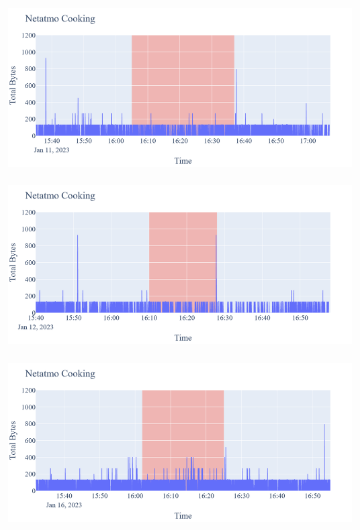 \begin{figure}[H]
\begin{subfigure}[b]{0.5\textwidth}
    \end{subfigure}
    \begin{subfigure}[b]{0.5\textwidth}
        \centering
        \includegraphics[width=1.2\hsize]{figures/Netatmo_Cooking_Bytes_11.01.png}
    \end{subfigure}
    \begin{subfigure}[b]{0.5\textwidth}
        \centering
        \includegraphics[width=1.2\hsize]{figures/Netatmo_Cooking_Bytes_12.01.png}
    \end{subfigure}
    \begin{subfigure}[b]{0.5\textwidth}
        \centering
        \includegraphics[width=1.2\hsize]{figures/Netatmo_Cooking_Bytes_16.01.png}
    \end{subfigure}
    \begin{subfigure}[b]{0.5\textwidth}

\end{subfigure}
\end{figure}
